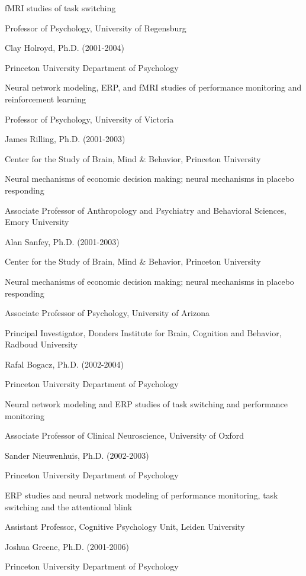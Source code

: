 \documentclass[10 pt]{article}
\begin{document}
fMRI studies of task switching

Professor of Psychology, University of Regensburg
    \medskip

Clay Holroyd, Ph.D. (2001-2004)

Princeton University Department of Psychology

Neural network modeling, ERP, and fMRI studies of performance monitoring and reinforcement learning

Professor of Psychology, University of Victoria
    \medskip

James Rilling, Ph.D. (2001-2003)

Center for the Study of Brain, Mind \& Behavior, Princeton University

Neural mechanisms of economic decision making; neural mechanisms in placebo responding

Associate Professor of Anthropology and Psychiatry and Behavioral Sciences, Emory University
    \medskip

Alan Sanfey, Ph.D. (2001-2003)

Center for the Study of Brain, Mind \& Behavior, Princeton University

Neural mechanisms of economic decision making; neural mechanisms in placebo responding

Associate Professor of Psychology, University of Arizona

Principal Investigator, Donders Institute for Brain, Cognition and Behavior, Radboud University
    \medskip

Rafal Bogacz, Ph.D. (2002-2004)

Princeton University Department of Psychology

Neural network modeling and ERP studies of task switching and performance monitoring

Associate Professor of Clinical Neuroscience, University of Oxford
    \medskip

Sander Nieuwenhuis, Ph.D. (2002-2003)

Princeton University Department of Psychology

ERP studies and neural network modeling of performance monitoring, task switching and the attentional blink

Assistant Professor, Cognitive Psychology Unit, Leiden University
    \medskip

Joshua Greene, Ph.D. (2001-2006)

Princeton University Department of Psychology
\end{document}
